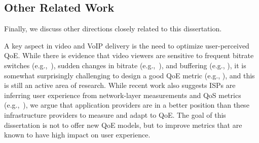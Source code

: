 




\subsection{Other Related Work}

Finally, we discuss other directions closely related to this dissertation.


A key aspect in  video  and VoIP delivery is the need to
optimize user-perceived  QoE. While there is evidence that
video viewers are sensitive to frequent bitrate switches 
(e.g.,~\cite{user-adaptive}), sudden
changes in bitrate (e.g.,~\cite{videoqoe}), and  buffering (e.g.,
\cite{sigcomm11}), it is somewhat surprisingly challenging 
to design a good QoE metric (e.g.,
\cite{qscore}), and this is still an active area of research.
While recent work also suggests ISPs are inferring  user 
experience from network-layer measurements and QoS metrics 
(e.g.,~\cite{mobicom2014-qos,sigmetrics2014-correlation,
hotmobile2014-prometheus,
imc2012-firstbyte,sigcomm2010-mercury}), we argue that 
application providers are in a better position than these 
infrastructure providers to measure and adapt to QoE.
The goal of this dissertation is not to offer new QoE models, 
but to improve metrics that are known to have high impact 
on user experience.

